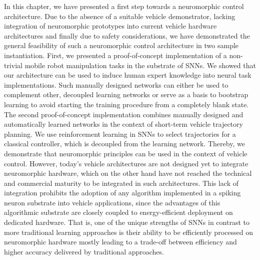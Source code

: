 In this chapter, we have presented a first step towards a neuromorphic control architecture.
Due to the absence of a suitable vehicle demonstrator, lacking integration of neuromorphic prototypes into current vehicle hardware architectures and finally due to safety considerations, we have demonstrated the general feasibility of such a neuromorphic control architecture in two sample instantiation.
First, we presented a proof-of-concept implementation of a non-trivial mobile robot manipulation tasks in the substrate of \acp{SNN}.
We showed that our architecture can be used to induce human expert knowledge into neural task implementations.
Such manually designed networks can either be used to complement other, decoupled learning networks or serve as a basis to bootstrap learning to avoid starting the training procedure from a completely blank state.
The second proof-of-concept implementation combines manually designed and automatically learned networks in the context of short-term vehicle trajectory planning.
We use reinforcement learning in \acp{SNN} to select trajectories for a classical controller, which is decoupled from the learning network.
Thereby, we demonstrate that neuromorphic principles can be used in the context of vehicle control.
However, today's vehicle architectures are not designed yet to integrate neuromorphic hardware, which on the other hand have not reached the technical and commercial maturity to be integrated in such architectures.
This lack of integration prohibits the adoption of any algorithm implemented in a spiking neuron substrate into vehicle applications, since the advantages of this algorithmic substrate are closely coupled to energy-efficient deployment on dedicated hardware.
That is, one of the unique strengths of \acp{SNN} in contrast to more traditional learning approaches is their ability to be efficiently processed on neuromorphic hardware mostly leading to a trade-off between efficiency and higher accuracy delivered by traditional approaches.


